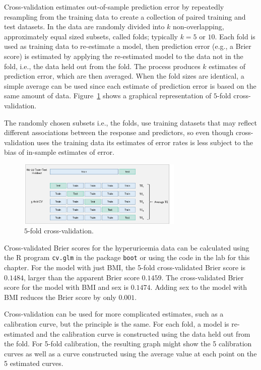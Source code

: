 Cross-validation estimates out-of-sample prediction error by repeatedly resampling from the training data to create a collection of paired training and test datasets. In  the data are randomly divided into $k$ non-overlapping, approximately equal sized subsets, called folds; typically $k = 5 \text{ or } 10$. Each fold is used as training data to re-estimate a model, then prediction error (e.g., a Brier score) is estimated by applying the re-estimated model to the data not in the fold, i.e., the data held out from the fold.  The process produces $k$ estimates of prediction error, which are then averaged. When the fold sizes are identical, a simple average can be used since each estimate of prediction error is based on the same amount of data. Figure~\ref{figure:crossValidation} shows a graphical representation of $5$-fold cross-validation.

The randomly chosen subsets i.e., the folds, use training datasets that may reflect different associations between the response and predictors, so even though cross-validation uses the training data its estimates of error rates is less subject to the bias of in-sample estimates of error.

\begin{figure}[h!]
  \centering
  \includegraphics[width=0.70\textwidth]
  {ch_logistic_regression_oi_biostat/figures/crossValidation/crossValidation.png}
    \caption{$5$-fold cross-validation.}
    \label{figure:crossValidation}
\end{figure}

Cross-validated Brier scores for the hyperuricemia data can be calculated using the \textsf{R} program \texttt{cv.glm} in the package \texttt{boot} or using the code in the lab for this chapter. For the model with just BMI, the 5-fold cross-validated Brier score is $0.1484$, larger than the apparent Brier score $0.1459$.  The cross-validated Brier score for the model with BMI and sex is $0.1474$.  Adding sex to the model with BMI reduces the Brier score by only $0.001$.  

Cross-validation can be used for more complicated estimates, such as a calibration curve, but the principle is the same.  For each fold, a model is re-estimated and the calibration curve is constructed using the data held out from the fold.  For 5-fold calibration, the resulting graph might show the 5 calibration curves as well as a curve constructed using the average value at each point on the 5 estimated curves. 

